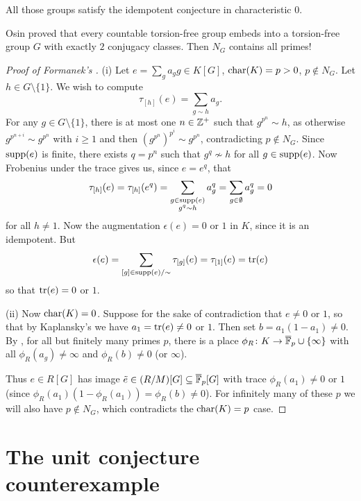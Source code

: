 \begin{corollary}
    All those groups satisfy the idempotent conjecture in characteristic $0$.
\end{corollary}

\begin{remark}
    Osin proved that every countable torsion-free group embeds into a torsion-free group $G$ with exactly $2$ conjugacy classes.
    Then $N_G$ contains all primes!
\end{remark}

\begin{proof}[Proof of Formanek's ]
    (i) Let $e = \sum_g a_g g \in K[G]$, $\mathrm{char}(K) = p > 0$, $p \notin N_G$.
    Let $h \in G \setminus \{1\}$.
    We wish to compute \[
        \tau_{[h]}(e) = \sum_{g \sim h} a_g.
    \] For any $g \in G \setminus \{1\}$, there is at most one $n \in \mathbb{Z}^+$ such that $g^{p^n} \sim h$, as otherwise $g^{p^{n+i}} \sim g^{p^n}$ with $i \geq 1$ and then $(g^{p^n})^{p^i} \sim g^{p^n}$, contradicting $p \notin N_G$.
    Since $\operatorname{supp}(e)$ is finite, there exists $q = p^n$ such that $g^q \not \sim h$ for all $g \in \operatorname{supp}(e)$.
    Now Frobenius under the trace gives us, since $e = e^q$, that \[
        \tau_{[h]}(e) = \tau_{[h]}(e^q) = \sum_{\substack{g \in \operatorname{supp}(e) \\ g^q \sim h}} a_g^q = \sum_{g \in \emptyset} a_g^q = 0
    \] for all $h \neq 1$.
    Now the augmentation $\epsilon(e) = 0$ or $1$ in $K$, since it is an idempotent.
    But \[
        \epsilon(e) = \sum_{[g] \in \operatorname{supp}(e) / {\sim}} \tau_{[g]}(e) = \tau_{[1]}(e) = \operatorname{tr}(e)
    \] so that $\operatorname{tr}(e) = 0$ or $1$.

    (ii) Now $\mathrm{char}(K) = 0$.
    Suppose for the sake of contradiction that $e \neq 0$ or $1$, so that by Kaplansky's  we have $a_1 = \operatorname{tr}(e) \neq 0$ or $1$.
    Then set $b = a_1 (1 - a_1) \neq 0$.
    By , for all but finitely many primes $p$, there is a place $\phi_R \colon K \to \overline{\mathbb{F}}_p \cup \{\infty\}$ with all $\phi_R(a_g) \neq \infty$ and $\phi_R(b) \neq 0$ (or $\infty$).

    Thus $e \in R[G]$ has image $\tilde{e} \in (R/M)[G] \subseteq \overline{\mathbb{F}}_p[G]$ with trace $\phi_R(a_1) \neq 0$ or $1$ (since $\phi_R(a_1) (1 - \phi_R(a_1)) = \phi_R(b) \neq 0$).
    For infinitely many of these $p$ we will also have $p \notin N_G$, which contradicts the $\mathrm{char}(K) = p$ case.
\end{proof}

\section{The unit conjecture counterexample}

